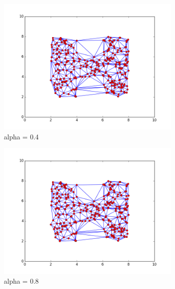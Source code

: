 \begin{figure}[h!]
    \centering
    \begin{subfigure}[b]{0.33\textwidth}
        \includegraphics[width=\linewidth]{img/triangulacja1.png}
        \caption {alpha = 0.4}
    \end{subfigure}
    \begin{subfigure}[b]{0.33\textwidth}
        \includegraphics[width=\linewidth]{img/triangulacja2.png}
        \caption {alpha = 0.8}
    \end{subfigure}%
	\begin{subfigure}[b]{0.33\textwidth}

\end{subfigure}
\end{figure}
